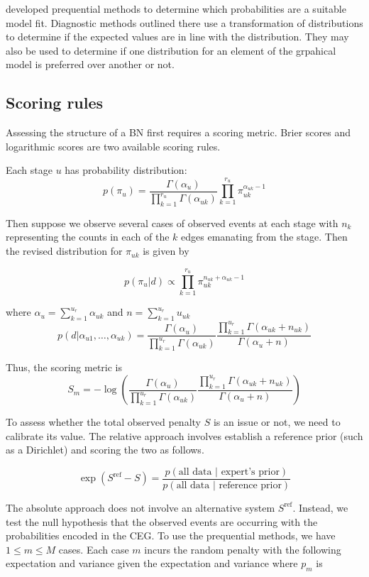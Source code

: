 \documentclass[12pt]{article}
\begin{document}
\cite{DAWID} developed prequential methods to determine which probabilities are a suitable model fit. Diagnostic methods outlined there use a transformation of distributions to determine if the expected values are in line with the distribution. They may also be used to determine if one distribution for an element of the grpahical model is preferred over another or not.

\subsection{Scoring rules}

Assessing the structure of a BN first requires a scoring metric. Brier scores and logarithmic scores are two available scoring rules. 

Each stage $u$ has probability distribution:
\[
p(\pi_u) = \frac{\Gamma (\alpha_u)}{\prod_{k=1}^{r_u} \Gamma (\alpha_{uk})} \prod_{k=1}^{r_u} \pi_{uk} ^{\alpha_{uk}-1}
\]

Then suppose we observe several cases of observed events at each stage with $n_k$ representing the counts in each of the $k$ edges emanating from the stage. Then the  revised distribution for $\pi_{uk}$ is given by 

\[
p(\pi_u | d) \propto \prod_{k=1}^{r_u} \pi_{uk}^{n_{uk} +\alpha_{uk} -1}
\]

where $\alpha_u = \sum_{k=1}^{u_r} \alpha_{uk}$ and $n = \sum_{k=1}^{u_r} u_{uk}$ 
\[
p(d | \alpha_{u1}, \ldots, \alpha_{uk}) = \frac{\Gamma(\alpha_u)}{\prod_{k=1}^{u_r} \Gamma(\alpha_{uk})} \frac{\prod_{k=1}^{u_r}\Gamma(\alpha_{uk} + n_{uk})}{\Gamma(\alpha_u + n)}
\]

Thus, the scoring metric is 
\[
S_m = -\log \left(\frac{\Gamma(\alpha_u)}{\prod_{k=1}^{u_r} \Gamma(\alpha_{uk})} \frac{\prod_{k=1}^{u_r}\Gamma(\alpha_{uk} + n_{uk})}{\Gamma(\alpha_u + n)}\right)
\]

To assess whether the total observed penalty $S$ is an issue or not, we need to calibrate its value. The relative approach involves establish a reference prior (such as a Dirichlet) and scoring the two as follows.

\[
\exp(S^{\text{ref}} - S) = \frac{p(\text{all data } | \text{ expert's prior})}{p(\text{all data } | \text{ reference prior})}
\]


The absolute approach does not involve an alternative system $S^{\text{ref}}$. Instead, we test the null hypothesis that the observed events are occurring with the probabilities encoded in the CEG. To use the prequential methods, we have $1 \leq m \leq M$ cases. Each case $m$  incurs the random penalty with the following expectation and variance given the expectation and variance where $p_m$ is 
\end{document}
